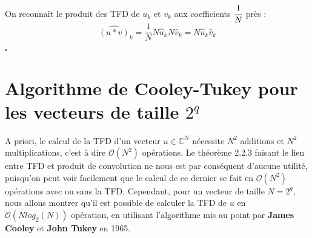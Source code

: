 \documentclass[12pt]{article}
\begin{document}
On reconnaît le produit des TFD de $u_k$ et $v_k$ aux coefficients $\cfrac{1}{N}$ près :
\begin{equation*}
\widehat{(u\ast v)}_k=\frac{1}{N}N\hat{u}_kN\hat{v}_k=N\hat{u}_k\hat{v}_k
\end{equation*}\begin{flushright} $\square$ \end{flushright}
\section{Algorithme de Cooley-Tukey pour les vecteurs de taille $2^q$}
A priori, le calcul de la TFD d'un vecteur $u \in\mathbb{C}^N$ nécessite $N^2$ additions et $N^2$ multiplications, c'est à dire $\mathcal{O}(N^2)$ opérations. Le théorème 2.2.3 faisant le lien entre TFD et produit de convolution ne nous est par conséquent d'aucune utilité, puisqu'on peut voir facilement que le calcul de ce dernier se fait en $\mathcal{O}(N^2)$ opérations avec ou sans la TFD. Cependant, pour un vecteur de taille $N=2^q$, nous allons montrer qu'il est possible de calculer la TFD de $u$ en $\mathcal{O}(Nlog_2(N))$ opération, en utilisant l'algorithme mis au point par \textbf{James Cooley} et \textbf{John Tukey} en 1965.
\end{document}

